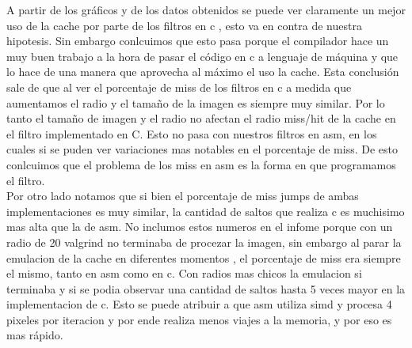 A partir de los gráficos y de los datos obtenidos se puede ver claramente un mejor uso de la cache por parte de los filtros en c , esto va en contra de nuestra hipotesis. Sin embargo conlcuimos que esto pasa porque el compilador hace un muy buen trabajo a la hora de pasar el código en c a lenguaje de máquina y que lo hace de una manera que aprovecha al máximo el uso la cache. Esta conclusión sale de que al ver el porcentaje de miss de los filtros en c a medida que aumentamos el radio y el tamaño de la imagen es siempre muy similar. Por lo tanto el tamaño de imagen y el radio no afectan el radio miss/hit de la cache en el filtro implementado en  C. Esto no pasa con nuestros filtros en asm, en los cuales si se puden ver variaciones mas notables en el porcentaje de miss. De esto conlcuimos que el problema de los miss en asm es la forma en que programamos el filtro. \\
Por otro lado notamos que si bien el porcentaje de miss jumps de ambas implementaciones es muy similar, la cantidad de saltos que realiza c es muchisimo mas alta que la de asm. No inclumos estos numeros en el infome porque con un radio de 20 valgrind no terminaba de procezar la imagen, sin embargo al parar la emulacion de la cache en diferentes momentos , el porcentaje de miss era siempre el mismo, tanto en asm como en c. Con radios mas chicos la emulacion si terminaba y si se podia observar una cantidad de saltos hasta 5 veces mayor en la implementacion de c. Esto se puede atribuir a que asm utiliza simd y procesa 4 pixeles por iteracion y por ende realiza menos viajes a la memoria, y por eso es mas rápido.

